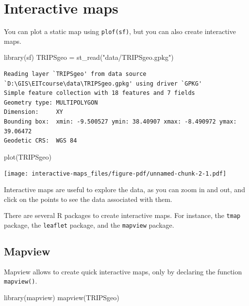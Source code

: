 \documentclass[
  letterpaper,
  DIV=11,
  numbers=noendperiod]{scrreprt}
\newenvironment{Shaded}{\begin{snugshade}}{\end{snugshade}}
\newcommand{\FunctionTok}[1]{\textcolor[rgb]{0.28,0.35,0.67}{#1}}
\newcommand{\NormalTok}[1]{\textcolor[rgb]{0.00,0.23,0.31}{#1}}
\newcommand{\OtherTok}[1]{\textcolor[rgb]{0.00,0.23,0.31}{#1}}
\newcommand{\StringTok}[1]{\textcolor[rgb]{0.13,0.47,0.30}{#1}}
\begin{document}
\chapter{Interactive maps}\label{interactive-maps}

You can plot a static map using \texttt{plof(sf)}, but you can also
create interactive maps.

\begin{Shaded}
\begin{Highlighting}[]
\FunctionTok{library}\NormalTok{(sf)}
\NormalTok{TRIPSgeo }\OtherTok{=} \FunctionTok{st\_read}\NormalTok{(}\StringTok{"data/TRIPSgeo.gpkg"}\NormalTok{)}
\end{Highlighting}
\end{Shaded}

\begin{verbatim}
Reading layer `TRIPSgeo' from data source `D:\GIS\EITcourse\data\TRIPSgeo.gpkg' using driver `GPKG'
Simple feature collection with 18 features and 7 fields
Geometry type: MULTIPOLYGON
Dimension:     XY
Bounding box:  xmin: -9.500527 ymin: 38.40907 xmax: -8.490972 ymax: 39.06472
Geodetic CRS:  WGS 84
\end{verbatim}

\begin{Shaded}
\begin{Highlighting}[]
\FunctionTok{plot}\NormalTok{(TRIPSgeo)}
\end{Highlighting}
\end{Shaded}

\texttt{[image: interactive-maps\_files/figure-pdf/unnamed-chunk-2-1.pdf]}

Interactive maps are useful to explore the data, as you can zoom in and
out, and click on the points to see the data associated with them.

There are several R packages to create interactive maps. For instance,
the \texttt{tmap} package, the \texttt{leaflet} package, and the
\texttt{mapview} package.

\section{Mapview}\label{mapview}

Mapview allows to create quick interactive maps, only by declaring the
function \texttt{mapview()}.

\begin{Shaded}
\begin{Highlighting}[]
\FunctionTok{library}\NormalTok{(mapview)}
\FunctionTok{mapview}\NormalTok{(TRIPSgeo)}
\end{Highlighting}
\end{Shaded}
\end{document}
